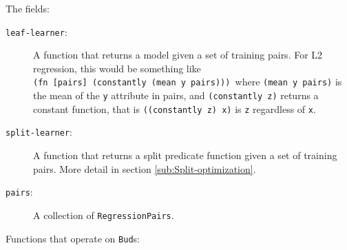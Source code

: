 \documentclass[11pt,openany,american,usenames,dvipsnames,svgnames,x11names,table,isodate]{article}
\numberwithin{equation}{section}
\numberwithin{figure}{section}
\begin{document}
The fields:
\begin{description}
\item [{\texttt{leaf-learner}:}] A function that returns a model given
a set of training pairs. For L2 regression, this would be something
like \texttt{(fn~{[}pairs{]}~(constantly~(mean~y~pairs))) }where
\texttt{(mean~y~pairs)} is the mean of the \texttt{y} attribute
in pairs, and \texttt{(constantly~z)} returns a constant function,
that is \texttt{((constantly~z)~x)} is \texttt{z} regardless of
\texttt{x}.
\item [{\texttt{split-learner}:}] A function that returns a split predicate
function given a set of training pairs. More detail in section \ref{sub:Split-optimization}.
\item [{\texttt{pairs}:}] A collection of \texttt{RegressionPairs}.
\end{description}
Functions that operate on \texttt{Bud}s:
\end{document}
